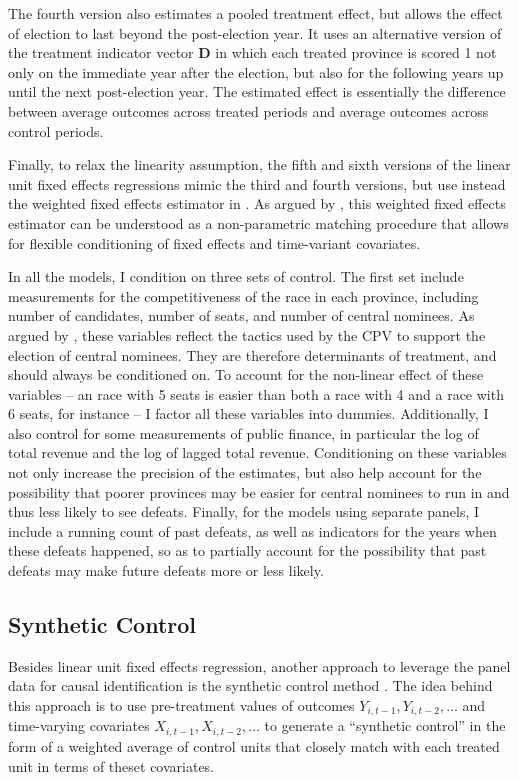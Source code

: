 \documentclass[12pt]{article}\usepackage[]{graphicx}\usepackage[]{color}
\newcommand{\1}{\mathbbm{1}}
\begin{document}
The fourth version also estimates a pooled treatment effect, but allows the effect of election to last beyond the post-election year. It uses an alternative version of the treatment indicator vector $\mathbf{D}$ in which each treated province is scored 1 not only on the immediate year after the election, but also for the following years up until the next post-election year. The estimated effect is essentially the difference between average outcomes across treated periods and average outcomes across control periods.

Finally, to relax the linearity assumption, the fifth and sixth versions of the linear unit fixed effects regressions mimic the third and fourth versions, but use instead the weighted fixed effects estimator in \cite{ImaiKim2012}. As argued by \cite{ImaiKim2012}, this weighted fixed effects estimator can be understood as a non-parametric matching procedure that allows for flexible conditioning of fixed effects and time-variant covariates.

In all the models, I condition on three sets of control. The first set include measurements for the competitiveness of the race in each province, including number of candidates, number of seats, and number of central nominees. As argued by \cite{MaleskySchuler2011}, these variables reflect the tactics used by the CPV to support the election of central nominees. They are therefore determinants of treatment, and should always be conditioned on. To account for the non-linear effect of these variables -- an race with 5 seats is easier than both a race with 4 and a race with 6 seats, for instance -- I factor all these variables into dummies. Additionally, I also control for some measurements of public finance, in particular the log of total revenue and the log of lagged total revenue. Conditioning on these variables not only increase the precision of the estimates, but also help account for the possibility that poorer provinces may be easier for central nominees to run in and thus less likely to see defeats. Finally, for the models using separate panels, I include a running count of past defeats, as well as indicators for the years when these defeats happened, so as to partially account for the possibility that past defeats may make future defeats more or less likely.

\subsection{Synthetic Control}
\label{sec:Synth}
Besides linear unit fixed effects regression, another approach to leverage the panel data for causal identification is the synthetic control method \citep{Abadie2010}. The idea behind this approach is to use pre-treatment values of outcomes $Y_{i,t-1},Y_{i, t-2},\dots$ and time-varying covariates $X_{i,t-1},X_{i, t-2},\dots$ to generate a ``synthetic control'' in the form of a weighted average of control units that closely match with each treated unit in terms of theset covariates.
\end{document}
